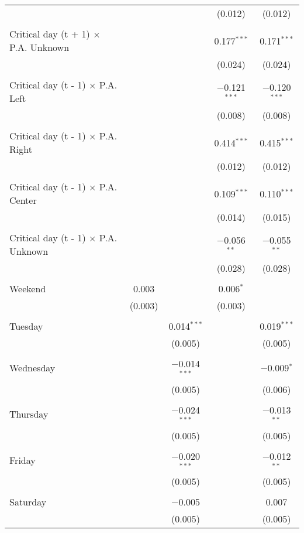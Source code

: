 \documentclass[
]{article}
\begin{document}
\begin{table}[!htbp]
{\begin{tabular}{@{\extracolsep{5pt}}lcccc}
  &  &  & (0.012) & (0.012) \\ 
  & & & & \\ 
 Critical day (t + 1) $\times$ P.A. Unknown &  &  & 0.177$^{***}$ & 0.171$^{***}$ \\ 
  &  &  & (0.024) & (0.024) \\ 
  & & & & \\ 
 Critical day (t - 1) $\times$ P.A. Left &  &  & $-$0.121$^{***}$ & $-$0.120$^{***}$ \\ 
  &  &  & (0.008) & (0.008) \\ 
  & & & & \\ 
 Critical day (t - 1) $\times$ P.A. Right &  &  & 0.414$^{***}$ & 0.415$^{***}$ \\ 
  &  &  & (0.012) & (0.012) \\ 
  & & & & \\ 
 Critical day (t - 1) $\times$ P.A. Center &  &  & 0.109$^{***}$ & 0.110$^{***}$ \\ 
  &  &  & (0.014) & (0.015) \\ 
  & & & & \\ 
 Critical day (t - 1) $\times$ P.A. Unknown &  &  & $-$0.056$^{**}$ & $-$0.055$^{**}$ \\ 
  &  &  & (0.028) & (0.028) \\ 
  & & & & \\ 
 Weekend & 0.003 &  & 0.006$^{*}$ &  \\ 
  & (0.003) &  & (0.003) &  \\ 
  & & & & \\ 
 Tuesday &  & 0.014$^{***}$ &  & 0.019$^{***}$ \\ 
  &  & (0.005) &  & (0.005) \\ 
  & & & & \\ 
 Wednesday &  & $-$0.014$^{***}$ &  & $-$0.009$^{*}$ \\ 
  &  & (0.005) &  & (0.006) \\ 
  & & & & \\ 
 Thursday &  & $-$0.024$^{***}$ &  & $-$0.013$^{**}$ \\ 
  &  & (0.005) &  & (0.005) \\ 
  & & & & \\ 
 Friday &  & $-$0.020$^{***}$ &  & $-$0.012$^{**}$ \\ 
  &  & (0.005) &  & (0.005) \\ 
  & & & & \\ 
 Saturday &  & $-$0.005 &  & 0.007 \\ 
  &  & (0.005) &  & (0.005) \\ 

\end{tabular}}
\end{table}
\end{document}
